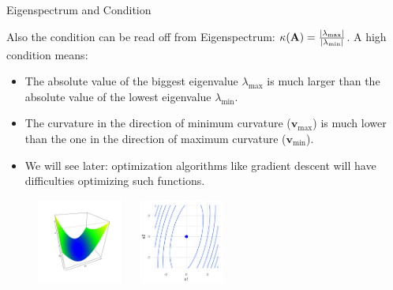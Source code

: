   \begin{vbframe}{Eigenspectrum and Condition}
  
  Also the condition can be read off from Eigenspectrum: $\kappa(\mathbf{A}) = \frac{|\lambda_\text{max}|}{|\lambda_\text{min}|}$. A high condition means: 
  
  \begin{itemize}
    \item The absolute value of the biggest eigenvalue $\lambda_\text{max}$ is much larger than the absolute value of the lowest eigenvalue $\lambda_\text{min}$. 
    \item The curvature in the direction of minimum curvature ($\textbf{v}_\text{max}$) is much lower than the one in the direction of maximum curvature ($\textbf{v}_\text{min}$).
    \item We will see later: optimization algorithms like gradient descent will have difficulties optimizing such functions. 
  \end{itemize}
  
  \vspace*{-0.3cm}
  
  \begin{figure}
    \includegraphics[height=0.25\textwidth, width = 0.25\textwidth]{figure_man/quadratic_functions_2D_bad_cond_1.png} ~~ \includegraphics[height=0.25\textwidth, width = 0.25\textwidth]{figure_man/quadratic_functions_2D_bad_cond_2.png}\\
    \begin{footnotesize} 
    \end{footnotesize}
  \end{figure}
  
  
  \end{vbframe}
  
